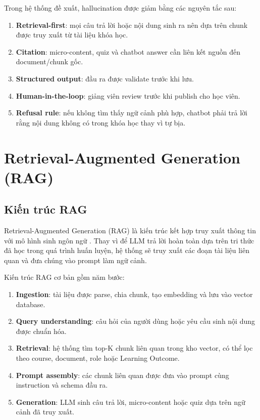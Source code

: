 Trong hệ thống đề xuất, hallucination được giảm bằng các nguyên tắc sau:

\begin{enumerate}
    \item \textbf{Retrieval-first}: mọi câu trả lời hoặc nội dung sinh ra nên
          dựa trên chunk được truy xuất từ tài liệu khóa học.
    \item \textbf{Citation}: micro-content, quiz và chatbot answer cần liên kết
          nguồn đến document/chunk gốc.
    \item \textbf{Structured output}: đầu ra được validate trước khi lưu.
    \item \textbf{Human-in-the-loop}: giảng viên review trước khi publish cho
          học viên.
    \item \textbf{Refusal rule}: nếu không tìm thấy ngữ cảnh phù hợp, chatbot
          phải trả lời rằng nội dung không có trong khóa học thay vì tự bịa.
\end{enumerate}

\section{Retrieval-Augmented Generation (RAG)}
\label{sec:rag}

\subsection{Kiến trúc RAG}
\label{subsec:kien-truc-rag}

Retrieval-Augmented Generation (RAG) là kiến trúc kết hợp truy xuất thông tin
với mô hình sinh ngôn ngữ \cite{lewis2020rag}. Thay vì để LLM trả lời hoàn
toàn dựa trên tri thức đã học trong quá trình huấn luyện, hệ thống sẽ truy xuất
các đoạn tài liệu liên quan và đưa chúng vào prompt làm ngữ cảnh.

Kiến trúc RAG cơ bản gồm năm bước:

\begin{enumerate}
    \item \textbf{Ingestion}: tài liệu được parse, chia chunk, tạo embedding và
          lưu vào vector database.
    \item \textbf{Query understanding}: câu hỏi của người dùng hoặc yêu cầu
          sinh nội dung được chuẩn hóa.
    \item \textbf{Retrieval}: hệ thống tìm top-K chunk liên quan trong kho
          vector, có thể lọc theo course, document, role hoặc Learning Outcome.
    \item \textbf{Prompt assembly}: các chunk liên quan được đưa vào prompt
          cùng instruction và schema đầu ra.
    \item \textbf{Generation}: LLM sinh câu trả lời, micro-content hoặc quiz
          dựa trên ngữ cảnh đã truy xuất.
\end{enumerate}

